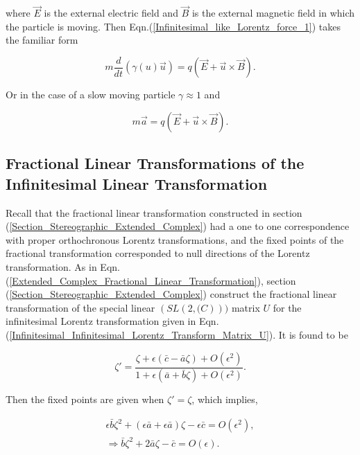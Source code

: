 \noindent where $\vec{E}$ is the external electric field and $\vec{B}$ is the external magnetic field in which the particle is moving. Then Eqn.(\ref{Infinitesimal_like_Lorentz_force_1}) takes the familiar form

\begin{equation*}
m \frac{d}{dt} (\gamma(u) \vec{u}) = q(\vec{E} + \vec{u} \times \vec{B}).
\end{equation*}

\noindent Or in the case of a slow moving particle $\gamma \approx 1$ and 

\begin{equation*}  
m \vec{a} = q (\vec{E} + \vec{u} \times \vec{B}).
\end{equation*}  

\subsection{Fractional Linear Transformations of the Infinitesimal Linear Transformation}\label{Infinitesimal_Section_Fractional_Linear}

Recall that the fractional linear transformation constructed in section (\ref{Section_Stereographic_Extended_Complex}) had a one to one correspondence with proper orthochronous Lorentz transformations, and the fixed points of the fractional transformation corresponded to null directions of the Lorentz transformation. As in Eqn.(\ref{Extended_Complex_Fractional_Linear_Transformation}), section (\ref{Section_Stereographic_Extended_Complex}) construct the fractional linear transformation of the special linear $(SL(2, \mathbb(C)))$ matrix $U$ for the infinitesimal Lorentz transformation given in Eqn.(\ref{Infinitesimal_Infinitesimal_Lorentz_Transform_Matrix_U}). It is found to be

\begin{equation*}   
\zeta' = \frac{\zeta + \epsilon(\bar{c} - \bar{a}\zeta) + O(\epsilon^2)}{1 + \epsilon(\bar{a} + \bar{b} \zeta) + O(\epsilon^2)}.
\end{equation*}

\noindent Then the fixed points are given when $\zeta' = \zeta$, which implies,

\begin{eqnarray}\nonumber
\epsilon \bar{b} \zeta^2 + (\epsilon \bar{a} + \epsilon \bar{a})\zeta - \epsilon \bar{c} = O(\epsilon^2), \\ \label{Infinitesimal_fixed_point_quadratic}
\Rightarrow \bar{b} \zeta^2 + 2 \bar{a} \zeta - \bar{c} = O(\epsilon).
\end{eqnarray}


